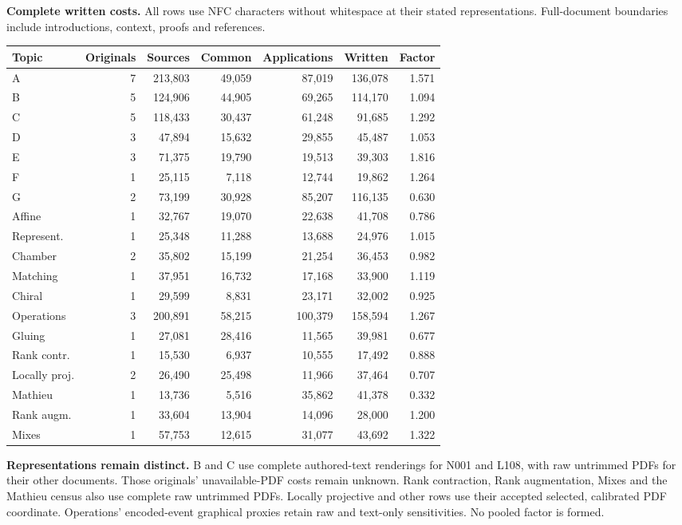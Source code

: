 \documentclass[11pt,a4paper]{article}
\newcommand{\tabsetup}{\small\setlength{\tabcolsep}{4pt}\renewcommand{\arraystretch}{1.10}}
\begin{document}
\textbf{Complete written costs.} All rows use NFC characters without whitespace at their stated representations. Full-document boundaries include introductions, context, proofs and references.
\begin{center}\tabsetup\begin{tabular}{lrrrrrr}\toprule
Topic & Originals & Sources & Common & Applications & Written & Factor\\\midrule
A & 7 & 213,803 & 49,059 & 87,019 & 136,078 & 1.571 \\
B & 5 & 124,906 & 44,905 & 69,265 & 114,170 & 1.094 \\
C & 5 & 118,433 & 30,437 & 61,248 & 91,685 & 1.292 \\
D & 3 & 47,894 & 15,632 & 29,855 & 45,487 & 1.053 \\
E & 3 & 71,375 & 19,790 & 19,513 & 39,303 & 1.816 \\
F & 1 & 25,115 & 7,118 & 12,744 & 19,862 & 1.264 \\
G & 2 & 73,199 & 30,928 & 85,207 & 116,135 & 0.630 \\
Affine & 1 & 32,767 & 19,070 & 22,638 & 41,708 & 0.786 \\
Represent. & 1 & 25,348 & 11,288 & 13,688 & 24,976 & 1.015 \\
Chamber & 2 & 35,802 & 15,199 & 21,254 & 36,453 & 0.982 \\
Matching & 1 & 37,951 & 16,732 & 17,168 & 33,900 & 1.119 \\
Chiral & 1 & 29,599 & 8,831 & 23,171 & 32,002 & 0.925 \\
Operations & 3 & 200,891 & 58,215 & 100,379 & 158,594 & 1.267 \\
Gluing & 1 & 27,081 & 28,416 & 11,565 & 39,981 & 0.677 \\
Rank contr. & 1 & 15,530 & 6,937 & 10,555 & 17,492 & 0.888 \\
Locally proj. & 2 & 26,490 & 25,498 & 11,966 & 37,464 & 0.707 \\
Mathieu & 1 & 13,736 & 5,516 & 35,862 & 41,378 & 0.332 \\
Rank augm. & 1 & 33,604 & 13,904 & 14,096 & 28,000 & 1.200 \\
Mixes & 1 & 57,753 & 12,615 & 31,077 & 43,692 & 1.322 \\
\bottomrule\end{tabular}\end{center}
\textbf{Representations remain distinct.} B and C use complete authored-text renderings for N001 and L108, with raw untrimmed PDFs for their other documents. Those originals' unavailable-PDF costs remain unknown. Rank contraction, Rank augmentation, Mixes and the Mathieu census also use complete raw untrimmed PDFs. Locally projective and other rows use their accepted selected, calibrated PDF coordinate. Operations' encoded-event graphical proxies retain raw and text-only sensitivities. No pooled factor is formed.
\end{document}
